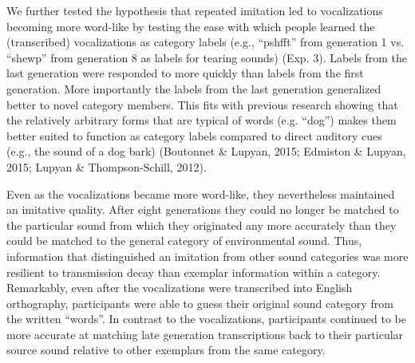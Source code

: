 \documentclass[english,floatsintext,man]{apa6}
\theoremstyle{definition}
\theoremstyle{definition}
\theoremstyle{definition}
\theoremstyle{remark}
\begin{document}
We further tested the hypothesis that repeated imitation led to
vocalizations becoming more word-like by testing the ease with which
people learned the (transcribed) vocalizations as category labels (e.g.,
\enquote{pshfft} from generation 1 vs. \enquote{shewp} from generation 8
as labels for tearing sounds) (Exp. 3). Labels from the last generation
were responded to more quickly than labels from the first generation.
More importantly the labels from the last generation generalized better
to novel category members. This fits with previous research showing that
the relatively arbitrary forms that are typical of words (e.g.
\enquote{dog}) makes them better suited to function as category labels
compared to direct auditory cues (e.g., the sound of a dog bark)
(Boutonnet \& Lupyan, 2015; Edmiston \& Lupyan, 2015; Lupyan \&
Thompson-Schill, 2012).

Even as the vocalizations became more word-like, they nevertheless
maintained an imitative quality. After eight generations they could no
longer be matched to the particular sound from which they originated any
more accurately than they could be matched to the general category of
environmental sound. Thus, information that distinguished an imitation
from other sound categories was more resilient to transmission decay
than exemplar information within a category. Remarkably, even after the
vocalizations were transcribed into English orthography, participants
were able to guess their original sound category from the written
\enquote{words}. In contrast to the vocalizations, participants
continued to be more accurate at matching late generation transcriptions
back to their particular source sound relative to other exemplars from
the same category.
\end{document}
